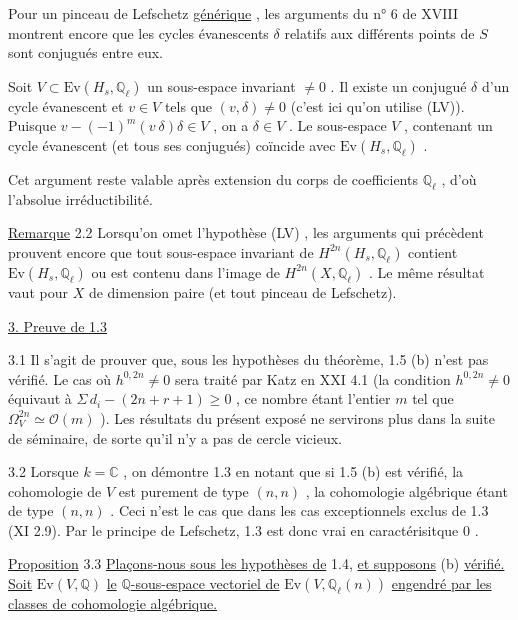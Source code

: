 Pour un pinceau de Lefschetz \underline{générique} , les arguments du n° 6 de XVIII montrent encore que les cycles évanescents $\delta$ relatifs aux différents points de $S$ sont conjugués entre eux.

Soit $V \subset \mathrm{Ev}(H_s, \mathbb{Q}_\ell)$ un sous-espace invariant $\neq 0$ . Il existe un conjugué $\delta$ d'un cycle évanescent et $v \in V$ tels que $(v, \delta) \neq 0$ (c'est ici qu'on utilise (LV)). Puisque $v - (-1)^m(v\ \delta)\delta \in V$ , on a $\delta \in V$ . Le sous-espace $V$ , contenant un cycle évanescent (et tous ses conjugués) coïncide avec $\mathrm{Ev}(H_s, \mathbb{Q}_\ell)$ .

Cet argument reste valable après extension du corps de coefficients $\mathbb{Q}_\ell$ , d'où l'absolue irréductibilité.

\underline{Remarque} 2.2 \quad Lorsqu'on omet l'hypothèse (LV) , les arguments qui précèdent prouvent encore que tout sous-espace invariant de $H^{2n}(H_s, \mathbb{Q}_\ell)$ contient $\mathrm{Ev}(H_s, \mathbb{Q}_\ell)$ ou est contenu dans l'image de $H^{2n}(X, \mathbb{Q}_\ell)$ . Le même résultat vaut pour $X$ de dimension paire (et tout pinceau de Lefschetz).


\underline{3. Preuve de 1.3}

3.1 \quad Il s'agit de prouver que, sous les hypothèses du théorème, 1.5 (b) n'est pas vérifié. Le cas où $h^{0,2n} \neq 0$ sera traité par Katz en XXI 4.1 (la condition $h^{0,2n} \neq 0$ équivaut à $\Sigma\, d_i - (2n + r + 1) \geq 0$ , ce nombre étant l'entier $m$ tel que $\Omega^{2n}_V \simeq \mathcal{O}(m)$ ). Les résultats du présent exposé ne servirons plus dans la suite de séminaire, de sorte qu'il n'y a pas de cercle vicieux.



3.2 \quad Lorsque $k = \mathbb{C}$ , on démontre 1.3 en notant que si 1.5 (b) est vérifié, la cohomologie de $V$ est purement de type $(n,n)$ , la cohomologie algébrique étant de type $(n,n)$ . Ceci n'est le cas que dans les cas exceptionnels exclus de 1.3 (XI 2.9). Par le principe de Lefschetz, 1.3 est donc vrai en caractérisitque $0$ .

\underline{Proposition} 3.3 \quad \underline{Plaçons-nous sous les hypothèses de} 1.4, \underline{et supposons} (b) \underline{vérifié.} \underline{Soit} $\mathrm{Ev}(V, \mathbb{Q})$ \underline{le} $\mathbb{Q}$\underline{-sous-espace vectoriel de} $\mathrm{Ev}(V, \mathbb{Q}_\ell(n))$ \underline{engendré par les classes de cohomologie algébrique.}

